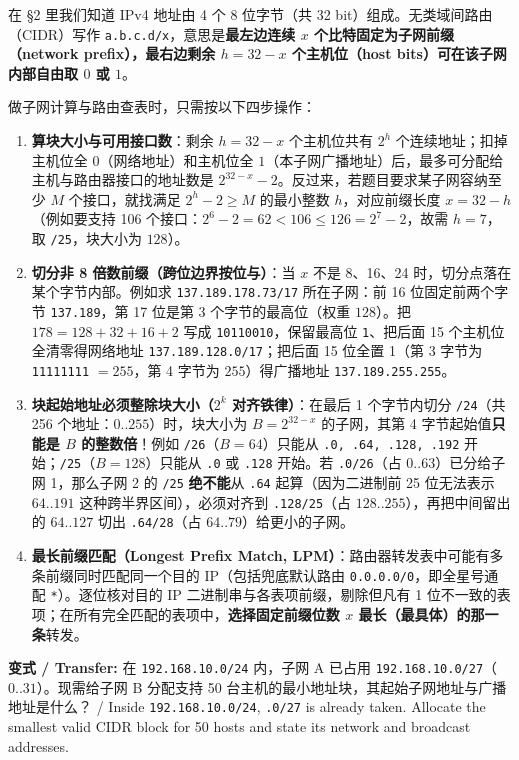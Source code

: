 在 §2 里我们知道 IPv4 地址由 4 个 8 位字节（共 32 bit）组成。无类域间路由（CIDR）写作 \texttt{a.b.c.d/x}，意思是\textbf{最左边连续 \(x\) 个比特固定为子网前缀（network prefix），最右边剩余 \(h = 32 - x\) 个主机位（host bits）可在该子网内部自由取 \(0\) 或 \(1\)}。


做子网计算与路由查表时，只需按以下四步操作：
\begin{enumerate}[start=1]
\item \textbf{算块大小与可用接口数}：剩余 \(h = 32 - x\) 个主机位共有 \(2^h\) 个连续地址；扣掉主机位全 \(0\)（网络地址）和主机位全 \(1\)（本子网广播地址）后，最多可分配给主机与路由器接口的地址数是 \(2^{32-x} - 2\)。反过来，若题目要求某子网容纳至少 \(M\) 个接口，就找满足 \(2^h - 2 \ge M\) 的最小整数 \(h\)，对应前缀长度 \(x = 32 - h\)（例如要支持 106 个接口：\(2^6 - 2 = 62 < 106 \le 126 = 2^7 - 2\)，故需 \(h = 7\)，取 \texttt{/25}，块大小为 \(128\)）。
\item \textbf{切分非 8 倍数前缀（跨位边界按位与）}：当 \(x\) 不是 8、16、24 时，切分点落在某个字节内部。例如求 \texttt{137.189.178.73/17} 所在子网：前 16 位固定前两个字节 \texttt{137.189}，第 17 位是第 3 个字节的最高位（权重 \(128\)）。把 \(178 = 128 + 32 + 16 + 2\) 写成 \texttt{10110010}，保留最高位 \texttt{1}、把后面 15 个主机位全清零得网络地址 \texttt{137.189.128.0/17}；把后面 15 位全置 1（第 3 字节为 \texttt{11111111} \(= 255\)，第 4 字节为 \(255\)）得广播地址 \texttt{137.189.255.255}。
\item \textbf{块起始地址必须整除块大小（\(2^k\) 对齐铁律）}：在最后 1 个字节内切分 \texttt{/24}（共 256 个地址：\(0..255\)）时，块大小为 \(B = 2^{32-x}\) 的子网，其第 4 字节起始值\textbf{只能是 \(B\) 的整数倍}！例如 \texttt{/26}（\(B = 64\)）只能从 \texttt{.0, .64, .128, .192} 开始；\texttt{/25}（\(B = 128\)）只能从 \texttt{.0} 或 \texttt{.128} 开始。若 \texttt{.0/26}（占 \(0..63\)）已分给子网 1，那么子网 2 的 \texttt{/25} \textbf{绝不能}从 \texttt{.64} 起算（因为二进制前 25 位无法表示 \(64..191\) 这种跨半界区间），必须对齐到 \texttt{.128/25}（占 \(128..255\)），再把中间留出的 \(64..127\) 切出 \texttt{.64/28}（占 \(64..79\)）给更小的子网。
\item \textbf{最长前缀匹配（Longest Prefix Match, LPM）}：路由器转发表中可能有多条前缀同时匹配同一个目的 IP（包括兜底默认路由 \texttt{0.0.0.0/0}，即全星号通配 \texttt{*}）。逐位核对目的 IP 二进制串与各表项前缀，剔除但凡有 1 位不一致的表项；在所有完全匹配的表项中，\textbf{选择固定前缀位数 \(x\) 最长（最具体）的那一条}转发。
\end{enumerate}


\textbf{变式 / Transfer:} 在 \texttt{192.168.10.0/24} 内，子网 A 已占用 \texttt{192.168.10.0/27}（\(0..31\)）。现需给子网 B 分配支持 50 台主机的最小地址块，其起始子网地址与广播地址是什么？ / Inside \texttt{192.168.10.0/24}, \texttt{.0/27} is already taken. Allocate the smallest valid CIDR block for 50 hosts and state its network and broadcast addresses.




